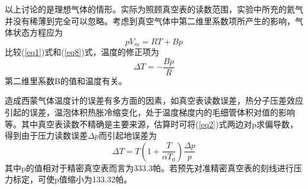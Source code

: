 \documentclass[a4paper]{article}
\begin{document}
以上讨论的是理想气体的情形。实际为照顾真空表的读数范围，实验中所充的氦气并没有稀薄到完全可以忽略。考虑到真空气体中第二维里系数项所产生的影响，气体状态方程应为
\begin{equation}
pV_m = RT + Bp\label{eq8}
\end{equation}
比较(\ref{eq1})式和(\ref{eq8})式，温度的修正项为
\begin{equation}
\Delta T = -\frac{Bp}{R}\label{eq9}
\end{equation}
第二维里系数B的值和温度有关。

造成西蒙气体温度计的误差有多方面的因素，如真空表读数误差，热分子压差效应引起的误差，温泡体积热胀冷缩变化，处于温度梯度内的毛细管体积对值的影响等。其中真空表读数不精确是主要来源，估算时可将(\ref{eq2})式两边对p求偏导数，得到由于压力读数误差$\Delta p$而引起地误差为
\begin{equation}
\Delta T = T\left(1+\frac{T}{\alpha T_0}\right)\frac{\Delta p}{p}\label{eq10}
\end{equation}
其中p的值相对于精密真空表而言为333.3帕。若预先对准精密真空表的刻线进行压力标定，可使p值缩小为133.32帕。
\end{document}

